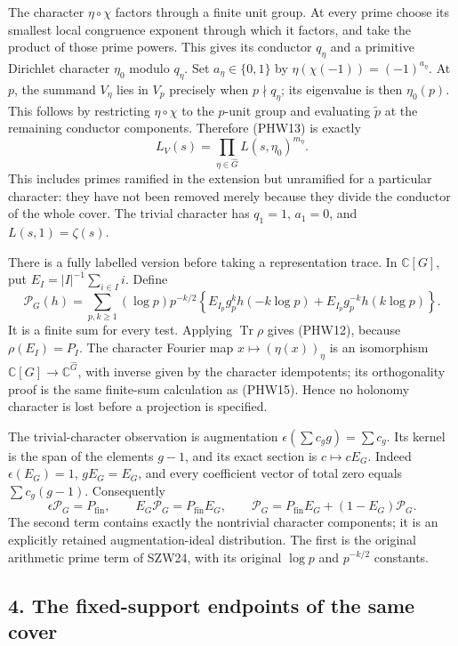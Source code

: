 \documentclass[
  10pt,
  a4paper,
]{article}
\begin{document}
The character \(\eta\circ\chi\) factors through a finite unit group. At
every prime choose its smallest local congruence exponent through which
it factors, and take the product of those prime powers. This gives its
conductor \(q_\eta\) and a primitive Dirichlet character \(\eta_0\)
modulo \(q_\eta\). Set \(a_\eta\in\{0,1\}\) by
\(\eta(\chi(-1))=(-1)^{a_\eta}\). At \(p\), the summand \(V_\eta\) lies
in \(V_p\) precisely when \(p\nmid q_\eta\); its eigenvalue is then
\(\eta_0(p)\). This follows by restricting \(\eta\circ\chi\) to the
\(p\)-unit group and evaluating \(\widetilde p\) at the remaining
conductor components. Therefore (PHW13) is exactly \[
L_V(s)=\prod_{\eta\in\widehat G}L(s,\eta_0)^{m_\eta}.
\tag{PHW16}
\] This includes primes ramified in the extension but unramified for a
particular character: they have not been removed merely because they
divide the conductor of the whole cover. The trivial character has
\(q_1=1\), \(a_1=0\), and \(L(s,1)=\zeta(s)\).

There is a fully labelled version before taking a representation trace.
In \(\mathbb C[G]\), put \(E_I=|I|^{-1}\sum_{i\in I}i\). Define \[
\mathscr P_G(h)=\sum_{p,k\ge1}(\log p)p^{-k/2}
\left\{E_{I_p}g_p^k h(-k\log p)
+E_{I_p}g_p^{-k} h(k\log p)\right\}.
\tag{PHW17}
\] It is a finite sum for every test. Applying \(\operatorname{Tr}\rho\)
gives (PHW12), because \(\rho(E_I)=P_I\). The character Fourier map
\(x\mapsto(\eta(x))_\eta\) is an isomorphism
\(\mathbb C[G]\to\mathbb C^{\widehat G}\), with inverse given by the
character idempotents; its orthogonality proof is the same finite-sum
calculation as (PHW15). Hence no holonomy character is lost before a
projection is specified.

The trivial-character observation is augmentation
\(\epsilon(\sum c_g g)=\sum c_g\). Its kernel is the span of the
elements \(g-1\), and its exact section is \(c\mapsto cE_G\). Indeed
\(\epsilon(E_G)=1\), \(gE_G=E_G\), and every coefficient vector of total
zero equals \(\sum c_g(g-1)\). Consequently \[
\epsilon\mathscr P_G=P_{\mathrm{fin}},
\qquad E_G\mathscr P_G=P_{\mathrm{fin}}E_G,
\qquad
\mathscr P_G=P_{\mathrm{fin}}E_G+(1-E_G)\mathscr P_G.
\tag{PHW18}
\] The second term contains exactly the nontrivial character components;
it is an explicitly retained augmentation-ideal distribution. The first
is the original arithmetic prime term of SZW24, with its original
\(\log p\) and \(p^{-k/2}\) constants.

\subsection{4. The fixed-support endpoints of the same
cover}\label{the-fixed-support-endpoints-of-the-same-cover}
\end{document}
